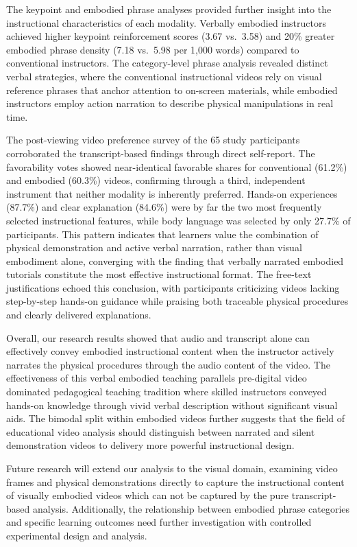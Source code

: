 \documentclass[fleqn,10pt]{JLA_article} %
\begin{document}
The keypoint and embodied phrase analyses provided further insight into the instructional characteristics of each modality. Verbally embodied instructors achieved higher keypoint reinforcement scores (3.67 vs.\ 3.58) and 20\% greater embodied phrase density (7.18 vs.\ 5.98 per 1{,}000 words) compared to conventional instructors. The category-level phrase analysis revealed distinct verbal strategies, where the conventional instructional videos rely on visual reference phrases that anchor attention to on-screen materials, while embodied instructors employ action narration to describe physical manipulations in real time.

The post-viewing video preference survey of the 65 study participants corroborated the transcript-based findings through direct self-report. The favorability votes showed near-identical favorable shares for conventional (61.2\%) and embodied (60.3\%) videos, confirming through a third, independent instrument that neither modality is inherently preferred. Hands-on experiences (87.7\%) and clear explanation (84.6\%) were by far the two most frequently selected instructional features, while body language was selected by only 27.7\% of participants. This pattern indicates that learners value the combination of physical demonstration and active verbal narration, rather than visual embodiment alone, converging with the finding that verbally narrated embodied tutorials constitute the most effective instructional format. The free-text justifications echoed this conclusion, with participants criticizing videos lacking step-by-step hands-on guidance while praising both traceable physical procedures and clearly delivered explanations.

Overall, our research results showed that audio and transcript alone can effectively convey embodied instructional content when the instructor actively narrates the physical procedures through the audio content of the video. The effectiveness of this verbal embodied teaching parallels pre-digital video dominated pedagogical teaching tradition where skilled instructors conveyed hands-on knowledge through vivid verbal description without significant visual aids. The bimodal split within embodied videos further suggests that the field of educational video analysis should distinguish between narrated and silent demonstration videos to delivery more powerful instructional design.

Future research will extend our analysis to the visual domain, examining video frames and physical demonstrations directly to capture the instructional content of visually embodied videos which can not be captured by the pure transcript-based analysis. Additionally, the relationship between embodied phrase categories and specific learning outcomes need further investigation with controlled experimental design and analysis.
\end{document}
